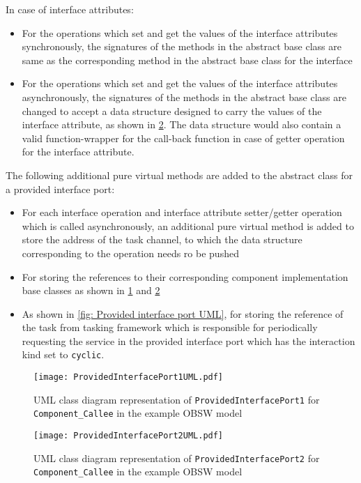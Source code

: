 In case of interface attributes:
\begin{itemize}
\item For the operations which set and get the values of the interface attributes synchronously, the signatures of the methods in the abstract base class are same as the corresponding method in the abstract base class for the interface
\item For the operations which set and get the values of the interface attributes asynchronously, the signatures of the methods in the abstract base class are changed to accept a data structure designed to carry the values of the interface attribute, as shown in \cref{fig: Provided interface port2 UML}. The data structure would also contain a valid function-wrapper for the call-back function in case of getter operation for the interface attribute.  
\end{itemize}

The following additional pure virtual methods are added to the abstract class for a provided interface port:
\begin{itemize}
\item For each interface operation and interface attribute setter/getter operation which is called asynchronously, an additional pure virtual method is added to store the address of the task channel, to which the data structure corresponding to the operation needs ro be pushed
\item For storing the references to their corresponding component implementation base classes as shown in \cref{fig: Provided interface port1 UML} and \cref{fig: Provided interface port2 UML}
\item As shown in \cref{fig: Provided interface port UML}, for storing the reference of the task from tasking framework which is responsible for periodically requesting the service in the provided interface port which has the interaction kind set to \texttt{cyclic}. 
\end{itemize}

\begin{figure}[h]
	\centering
	\texttt{[image: ProvidedInterfacePort1UML.pdf]}
	\caption{UML class diagram representation of \texttt{Provided\allowbreak Interface\allowbreak Port1} for \texttt{Component\allowbreak\_Callee} in the example OBSW model}
	\label{fig: Provided interface port1 UML}
\end{figure}

\begin{figure}[h]
	\centering
	\texttt{[image: ProvidedInterfacePort2UML.pdf]}
	\caption{UML class diagram representation of \texttt{Provided\allowbreak Interface\allowbreak Port2} for \texttt{Component\allowbreak\_Callee} in the example OBSW model}
	\label{fig: Provided interface port2 UML}
\end{figure}

